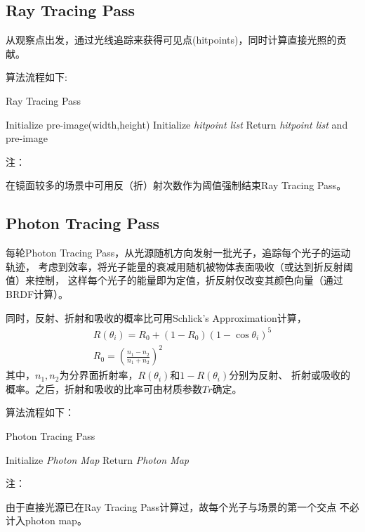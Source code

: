 \documentclass[a4paper,12pt]{article}
\theoremstyle{plain}
\numberwithin{thmdef}{section}
\begin{document}
\subsection{Ray Tracing Pass}
从观察点出发，通过光线追踪来获得可见点(hitpoints)，同时计算直接光照的贡献。\par
算法流程如下:\\
\begin{algorithm}[H]
\caption{Ray Tracing Pass}
\LinesNumbered
{}
Initialize pre-image(width,height)\;
Initialize \textit{hitpoint list}\;
Return \textit{hitpoint list} and pre-image\;
\end{algorithm}
\noindent 注：\par
在镜面较多的场景中可用反（折）射次数作为阈值强制结束Ray Tracing Pass。
\subsection{Photon Tracing Pass}
每轮Photon Tracing Pass，从光源随机方向发射一批光子，追踪每个光子的运动轨迹，%
考虑到效率，将光子能量的衰减用随机被物体表面吸收（或达到折反射阈值）来控制，%
这样每个光子的能量即为定值，折反射仅改变其颜色向量（通过BRDF计算）。\par
同时，反射、折射和吸收的概率比可用Schlick's Approximation计算，
\begin{gather}
R(\theta_i)=R_0+(1-R_0)(1-\cos\theta_i)^5\\
R_0=\left(\frac{n_1-n_2}{n_1+n_2}\right)^2
\end{gather}
其中，$n_1,n_2$为分界面折射率，$R(\theta_i)$和$1-R(\theta_i)$分别为反射、%
折射或吸收的概率。之后，折射和吸收的比率可由材质参数$Tr$确定。\par
算法流程如下：\\
\begin{algorithm}[H]
\caption{Photon Tracing Pass}
\LinesNumbered
{}
Initialize \textit{Photon Map}\;
Return \textit{Photon Map}\;
\end{algorithm}
\noindent 注：\par
由于直接光源已在Ray Tracing Pass计算过，故每个光子与场景的第一个交点%
不必计入photon map。
\end{document}
